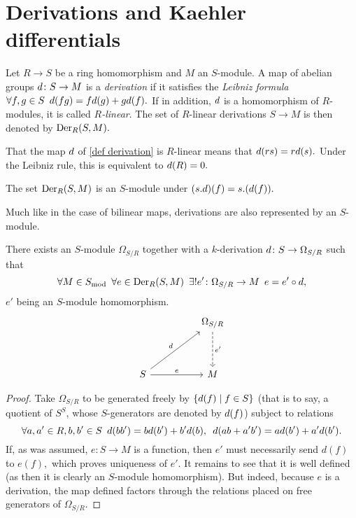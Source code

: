 \section{Derivations and Kaehler differentials}
\label{kaehler section}

\begin{df}
  \label{def derivation}
  Let \(R \to S\) be a ring homomorphism and \(M\) an \(S\)-module. A map of abelian groups \(d \colon S \to M\) is a \emph{derivation} if it satisfies the \emph{Leibniz formula}
  \(\forall f, g \in S \enspace d(fg) = f d(g) + g d(f).\)
  If in addition, \(d\) is a homomorphism of \(R\)-modules, it is called \emph{\(R\)-linear}.
  The set of \(R\)-linear derivations \(S \to M\) is then denoted by \(\operatorname{Der}_R(S, M).\)
\end{df}

\begin{note}
  That the map \(d\) of \cref{def derivation} is \(R\)-linear means that \(d(rs) = r d(s).\) Under the Leibniz rule, this is equivalent to \(d(R) = 0.\)
\end{note}

\begin{prop}
  The set \(\operatorname{Der}_R(S, M)\) is an \(S\)-module under
  \((s . d)(f) = s .(d(f)).\)
\end{prop}

Much like in the case of bilinear maps, derivations are also represented by an \(S\)-module.

\begin{theorem}
  \label{kaehler exists}
  There exists an $S$-module
  \( \Omega_{S / {R}}\)
  together with a \(k\)-derivation
  \(d \colon S \to \Omega_{S /{R}}\)
  such that
  \[ \forall M \in {S}_\mathrm{mod} \enspace \forall e \in \operatorname{Der}_R(S, M) \enspace \exists \text{!} e' \colon \Omega_{S /{R}} \to M \enspace e = e' \circ d,\]
  \(e'\) being an \(S\)-module homomorphism.
  \begin{equation*}
    \begin{tikzcd}[column sep = huge, row sep = huge]
      & \Omega_{S/{R}} \arrow[dashed]{d}{e'} \\
      S \arrow{ru}{\dif} \arrow{r}{e} & M
    \end{tikzcd}
  \end{equation*}
\end{theorem}
\begin{proof}
  Take \(\Omega_{S/{R}}\) to be generated freely by \(\{d(f) \mathrel{|} f \in S\}\) (that is to say, a quotient of \(S^S\), whose \(S\)-generators are denoted by \(d(f)\)) subject to relations
  \[\forall a, a' \in R, b, b' \in S \enspace d(b b') = b d(b') + b' d (b), \enspace d(ab + a'b') = a d(b') + a' d(b').\]
  If, as was assumed, \(e \colon S \to M\) is a function, then \(e'\) must necessarily send \(d(f)\) to \(e(f),\) which proves uniqueness of \(e'.\) It remains to see that it is well defined (as then it is clearly an \(S\)-module homomorphism). But indeed, because \(e\) is a derivation, the map defined factors through the relations placed on free generators of \(\Omega_{S/{R}}.\)
\end{proof}

